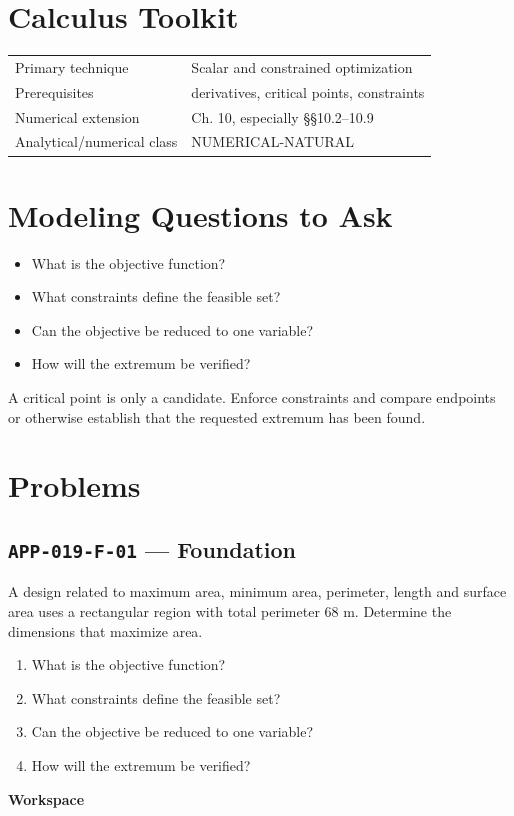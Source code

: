 \documentclass[11pt]{book}
\newcommand{\pid}[1]{\texttt{#1}}
\newcommand{\workspace}{\par\vspace{0.7in}\hrulefill\par\vspace{0.55in}\hrulefill\par}
\begin{document}
\section*{Calculus Toolkit}
\begin{tabularx}{\textwidth}{@{}lX@{}}\toprule
Primary technique & Scalar and constrained optimization \\
Prerequisites & derivatives, critical points, constraints \\
Numerical extension & Ch. 10, especially §§10.2–10.9 \\
Analytical/numerical class & NUMERICAL-NATURAL \\
\bottomrule\end{tabularx}
\section*{Modeling Questions to Ask}\begin{itemize}
\item What is the objective function?
\item What constraints define the feasible set?
\item Can the objective be reduced to one variable?
\item How will the extremum be verified?
\end{itemize}
\begin{errorbox}A critical point is only a candidate. Enforce constraints and compare endpoints or otherwise establish that the requested extremum has been found.\end{errorbox}
\section*{Problems}
\subsection*{\pid{APP-019-F-01} — Foundation}
\begin{problembox}
A design related to maximum area, minimum area, perimeter, length and surface area uses a rectangular region with total perimeter 68 m. Determine the dimensions that maximize area.
\end{problembox}
\begin{promptbox}\begin{enumerate}
\item What is the objective function?
\item What constraints define the feasible set?
\item Can the objective be reduced to one variable?
\item How will the extremum be verified?
\end{enumerate}\end{promptbox}
\textbf{Workspace}\workspace
{}
\end{document}
